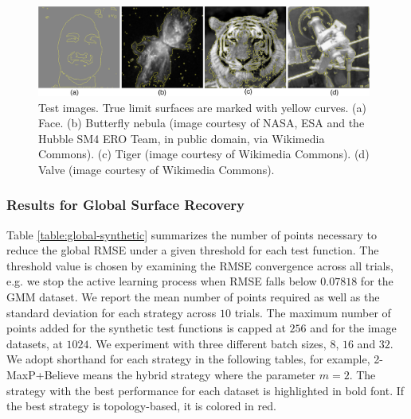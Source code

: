 \begin{figure}[!ht]
\centering
\includegraphics[width=0.98\textwidth]{figs/chap5/images}
\caption{Test images. True limit surfaces are marked with yellow curves.
%
(a) Face.
%
(b) Butterfly nebula (image courtesy of NASA, ESA and the Hubble SM4 ERO Team,
in public domain, via Wikimedia Commons).
%
(c) Tiger (image courtesy of Wikimedia Commons).
%
(d) Valve (image courtesy of Wikimedia Commons).}
\label{fig:images}
\end{figure}

\subsubsection{Results for Global Surface Recovery}
\label{sec:global_results}
%
Table \ref{table:global-synthetic} summarizes the number of points necessary to reduce the global RMSE under a given threshold for each test function.
%
The threshold value is chosen by examining the RMSE convergence across all trials, e.g. we stop the active learning process when RMSE falls below $0.07818$ for the GMM dataset.
%
We report the mean number of points required as well as the standard deviation for each strategy across $10$ trials.
%
The maximum number of points added for the synthetic test functions is capped at $256$ and for the image datasets, at $1024$.
%
We experiment with three different batch sizes, $8$, $16$ and $32$.
%
We adopt shorthand for each strategy in the following tables, for example, 2-MaxP+Believe means the hybrid strategy where the parameter $m = 2$.
%
The strategy with the best performance for each dataset is highlighted in bold font.
%
If the best strategy is topology-based, it is colored in red.

